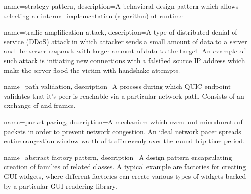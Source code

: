 {
  name=strategy pattern,
  description={A behavioral design pattern which allows selecting an internal implementation (algorithm) at runtime.}
}

{
  name=traffic amplification attack,
  description={A type of distributed denial-of-service (DDoS) attack in which attacker sends a small amount of data to a server and the server responds with larger amount of data to the target. An example of such attack is initiating new connections with a falsified source IP address which make the server flood the victim with handshake attempts.}
}

{
  name=path validation,
  description={A process during which QUIC endpoint validates that it's peer is reachable via a particular \gls{network-path}. Consists of an exchange of \PATHCHALLENGE{} and \PATHRESPONSE{} frames.}
}

{
  name=packet pacing,
  description={A mechanism which evens out microbursts of packets in order to prevent network congestion. An ideal network pacer spreads entire congestion window worth of traffic evenly over the round trip time period.}
}

{
  name=abstract factory pattern,
  description={A design pattern encapsulating creation of families of related classes. A typical example are factories for creating GUI widgets, where different factories can create various types of widgets backed by a particular GUI rendering library.}
}






